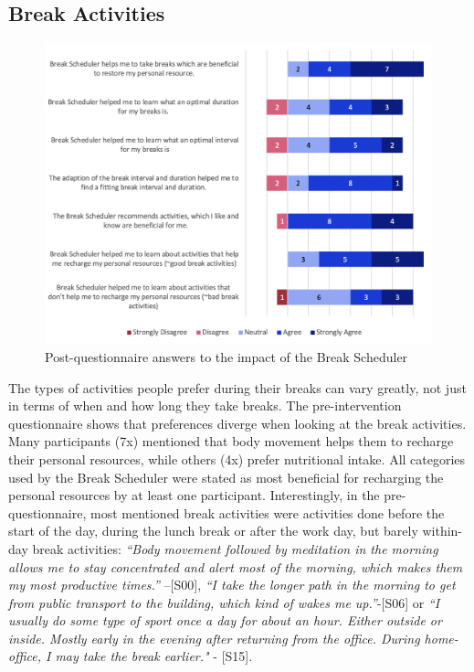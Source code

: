 \documentclass{hasel_thesis}
\begin{document}
\subsection{Break Activities} \label{activities_difference}

\begin{figure}[htp]
    \centering
    \includegraphics[width=12cm]{hasel_thesis/images/agreement_4.png}
    \caption{Post-questionnaire answers to the impact of the Break Scheduler }
    \label{fig:impact_agreement}
\end{figure}

The types of activities people prefer during their breaks can vary greatly, not just in terms of when and how long they take breaks. The pre-intervention questionnaire shows that preferences diverge when looking at the break activities. Many participants (7x) mentioned that body movement helps them to recharge their personal resources, while others (4x) prefer nutritional intake. All categories used by the Break Scheduler were stated as most beneficial for recharging the personal resources by at least one participant. Interestingly, in the pre-questionnaire, most mentioned break activities were activities done before the start of the day, during the lunch break or after the work day, but barely within-day break activities: \textit{“Body movement followed by meditation in the morning allows me to stay concentrated and alert most of the morning, which makes them my most productive times.”} –[S00],  \textit{“I take the longer path in the morning to get from public transport to the building, which kind of wakes me up.”}-[S06] or \textit{“I usually do some type of sport once a day for about an hour. Either outside or inside. Mostly early in the evening after returning from the office. During home-office, I may take the break earlier."} - [S15]. 
\end{document}
